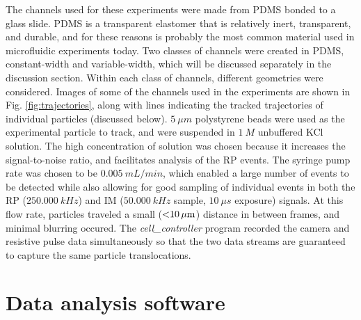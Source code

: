 		
		The channels used for these experiments were made from PDMS bonded to a glass slide. PDMS is a transparent elastomer that is relatively inert, transparent, and durable, and for these reasons is probably the most common material used in microfluidic experiments today. Two classes of channels were created in PDMS, constant-width and variable-width, which will be discussed separately in the discussion section. Within each class of channels, different geometries were considered. Images of some of the channels used in the experiments are shown in Fig. \ref{fig:trajectories}, along with lines indicating the tracked trajectories of individual particles (discussed below). $\SI{5}{\mu m}$ polystyrene beads were used as the experimental particle to track, and were suspended in $\SI{1}{M}$ unbuffered KCl solution. The high concentration of solution was chosen because it increases the signal-to-noise ratio, and facilitates analysis of the RP events. The syringe pump rate was chosen to be $\SI{0.005}{mL/min}$, which enabled a large number of events to be detected while also allowing for good sampling of individual events in both the RP ($\SI{250,000}{kHz}$) and IM ($\SI{50,000}{kHz}$ sample, $\SI{10}{\mu s}$ exposure) signals. At this flow rate, particles traveled a small ($\SI{<10}{\mu m}$) distance in between frames, and minimal blurring occured. The \textit{cell\_controller} program recorded the camera and resistive pulse data simultaneously so that the two data streams are guaranteed to capture the same particle translocations.
		
	\section{Data analysis software}
		
